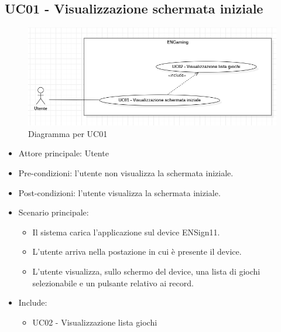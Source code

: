 \subsection{UC01 - Visualizzazione schermata iniziale}
\begin{figure}[h]
    \centering
    \includegraphics[width=400pt]{images/usecase/UC01.png}
    \caption{Diagramma per UC01}
    \label{fig:attore}
\end{figure}
\begin{itemize}
    \item Attore principale: Utente
    \item Pre-condizioni: l'utente non visualizza la schermata iniziale.
    \item Post-condizioni: l'utente visualizza la schermata iniziale.
    \item Scenario principale: \begin{itemize}
        \item Il sistema carica l'applicazione sul device ENSign11.
        \item L'utente arriva nella postazione in cui è presente il device.
        \item L'utente visualizza, sullo schermo del device, una lista di giochi selezionabile e un pulsante relativo ai record.
    \end{itemize}
    \item Include: \begin{itemize}
        \item UC02 - Visualizzazione lista giochi
    \end{itemize}
\end{itemize}


